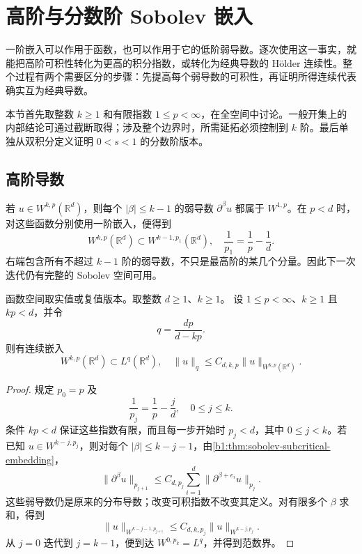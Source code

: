 \section{高阶与分数阶 Sobolev 嵌入}
\label{b1:sec:2404}

一阶嵌入可以作用于函数，也可以作用于它的低阶弱导数。逐次使用这一事实，就能把高阶可积性转化为更高的积分指数，或转化为经典导数的 Hölder 连续性。整个过程有两个需要区分的步骤：先提高每个弱导数的可积性，再证明所得连续代表确实互为经典导数。

\ProseParagraphBreak

本节首先取整数 \(k\ge1\) 和有限指数 \(1\le p<\infty\)，在全空间中讨论。一般开集上的内部结论可通过截断取得；涉及整个边界时，所需延拓必须控制到 \(k\) 阶。最后单独从双积分定义证明 \(0<s<1\) 的分数阶版本。

\subsection{高阶导数}
\label{b1:subsec:240401}

若 \(u\in W^{k,p}(\mathbb R^d)\)，则每个 \(|\beta|\le k-1\) 的弱导数 \(\partial^\beta u\) 都属于 \(W^{1,p}\)。在 \(p<d\) 时，对这些函数分别使用一阶嵌入，便得到
\[
 W^{k,p}(\mathbb R^d)\subset W^{k-1,p_1}(\mathbb R^d),
 \quad \frac1{p_1}=\frac1p-\frac1d.
\]
右端包含所有不超过 \(k-1\) 阶的弱导数，不只是最高阶的某几个分量。因此下一次迭代仍有完整的 Sobolev 空间可用。

\begin{theorem}\label{b1:thm:higher-order-subcritical-embedding}
函数空间取实值或复值版本。取整数 \(d\geq1\)、\(k\geq1\)。
设 \(1\le p<\infty\)、\(k\ge1\) 且 \(kp<d\)，并令
\[
 q=\frac{dp}{d-kp}.
\]
则有连续嵌入
\[
 W^{k,p}(\mathbb R^d)\subset L^q(\mathbb R^d),
 \quad
 \|u\|_q\le C_{d,k,p}\|u\|_{W^{k,p}(\mathbb R^d)}.
\]
\end{theorem}
\begin{proof}
规定 \(p_0=p\) 及
\[
 \frac1{p_j}=\frac1p-\frac jd,\quad 0\le j\le k.
\]
条件 \(kp<d\) 保证这些指数有限，而且每一步开始时 \(p_j<d\)，其中 \(0\le j<k\)。若已知 \(u\in W^{k-j,p_j}\)，则对每个 \(|\beta|\le k-j-1\)，由\cref{b1:thm:sobolev-subcritical-embedding}，
\[
 \|\partial^\beta u\|_{p_{j+1}}
 \le C_{d,p_j}\sum_{i=1}^d
                  \|\partial^{\beta+e_i}u\|_{p_j}.
\]
这些弱导数仍是原来的分布导数；改变可积指数不改变其定义。对有限多个 \(\beta\) 求和，得到
\[
 \|u\|_{W^{k-j-1,p_{j+1}}}
 \le C_{d,k,p_j}\|u\|_{W^{k-j,p_j}}.
\]
从 \(j=0\) 迭代到 \(j=k-1\)，便到达 \(W^{0,p_k}=L^q\)，并得到范数界。
\end{proof}

